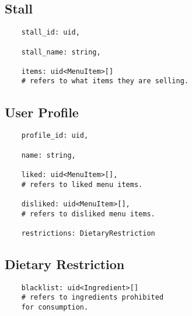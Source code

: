 \subsection{Stall}
\label{schema:stall}
\begin{verbatim}
    stall_id: uid,

    stall_name: string,

    items: uid<MenuItem>[]
    # refers to what items they are selling.
\end{verbatim}

\subsection{User Profile}
\label{schema:user-profile}
\begin{verbatim}
    profile_id: uid,
    
    name: string,
    
    liked: uid<MenuItem>[],
    # refers to liked menu items.

    disliked: uid<MenuItem>[],
    # refers to disliked menu items.

    restrictions: DietaryRestriction
\end{verbatim}

\subsection{Dietary Restriction}
\label{schema:dietary-restriction}
\begin{verbatim}
    blacklist: uid<Ingredient>[]
    # refers to ingredients prohibited
    for consumption.
\end{verbatim}